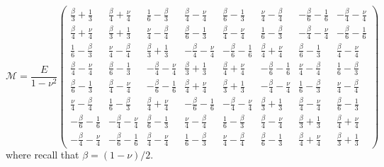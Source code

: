 \documentclass[11pt]{article}
\begin{document}
\begin{equation}
\mathcal{M} = \frac{E}{1-\nu^2}
\begin{pmatrix}
 	\frac{\beta}{3} + \frac{1}{3} &   \frac{\beta}{4} + \frac{\nu}{4} & \frac{1}{6} - \frac{\beta}{3} &   \frac{\beta}{4} - \frac{\nu}{4} & \frac{\beta}{6} - \frac{1}{3} &   \frac{\nu}{4} - \frac{\beta}{4} &  - \frac{\beta}{6} - \frac{1}{6} & - \frac{\beta}{4} - \frac{\nu}{4} \\
	\frac{\beta}{4} + \frac{\nu}{4} & \frac{\beta}{3} + \frac{1}{3} &   \frac{\nu}{4} - \frac{\beta}{4} & \frac{\beta}{6} - \frac{1}{3} &   \frac{\beta}{4} - \frac{\nu}{4} & \frac{1}{6} - \frac{\beta}{3} & - \frac{\beta}{4} - \frac{\nu}{4} &  - \frac{\beta}{6} - \frac{1}{6} \\
	\frac{1}{6} - \frac{\beta}{3} &   \frac{\nu}{4} - \frac{\beta}{4} & \frac{\beta}{3} + \frac{1}{3} & - \frac{\beta}{4} - \frac{\nu}{4} &  - \frac{\beta}{6} - \frac{1}{6} &   \frac{\beta}{4} + \frac{\nu}{4} & \frac{\beta}{6} - \frac{1}{3} &   \frac{\beta}{4} - \frac{\nu}{4} \\
	\frac{\beta}{4} - \frac{\nu}{4} & \frac{\beta}{6} - \frac{1}{3} & - \frac{\beta}{4} - \frac{\nu}{4} & \frac{\beta}{3} + \frac{1}{3} &   \frac{\beta}{4} + \frac{\nu}{4} &  - \frac{\beta}{6} - \frac{1}{6} &   \frac{\nu}{4} - \frac{\beta}{4} & \frac{1}{6} - \frac{\beta}{3} \\
	\frac{\beta}{6} - \frac{1}{3} &   \frac{\beta}{4} - \frac{\nu}{4} &  - \frac{\beta}{6} - \frac{1}{6} &   \frac{\beta}{4} + \frac{\nu}{4} & \frac{\beta}{3} + \frac{1}{3} & - \frac{\beta}{4} - \frac{\nu}{4} & \frac{1}{6} - \frac{\beta}{3} &   \frac{\nu}{4} - \frac{\beta}{4} \\
	\frac{\nu}{4} - \frac{\beta}{4} & \frac{1}{6} - \frac{\beta}{3} &   \frac{\beta}{4} + \frac{\nu}{4} &  - \frac{\beta}{6} - \frac{1}{6} & - \frac{\beta}{4} - \frac{\nu}{4} & \frac{\beta}{3} + \frac{1}{3} &   \frac{\beta}{4} - \frac{\nu}{4} & \frac{\beta}{6} - \frac{1}{3} \\
	- \frac{\beta}{6} - \frac{1}{6} & - \frac{\beta}{4} - \frac{\nu}{4} & \frac{\beta}{6} - \frac{1}{3} &   \frac{\nu}{4} - \frac{\beta}{4} & \frac{1}{6} - \frac{\beta}{3} &   \frac{\beta}{4} - \frac{\nu}{4} & \frac{\beta}{3} + \frac{1}{3} &   \frac{\beta}{4} + \frac{\nu}{4} \\
	- \frac{\beta}{4} - \frac{\nu}{4} &  - \frac{\beta}{6} - \frac{1}{6} &   \frac{\beta}{4} - \frac{\nu}{4} & \frac{1}{6} - \frac{\beta}{3} &   \frac{\nu}{4} - \frac{\beta}{4} & \frac{\beta}{6} - \frac{1}{3} &   \frac{\beta}{4} + \frac{\nu}{4} & \frac{\beta}{3} + \frac{1}{3}
\end{pmatrix}
\end{equation}
where recall that $\beta = (1-\nu)/2$.
\end{document}
